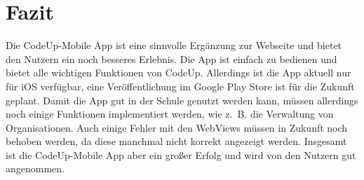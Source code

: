 \documentclass[main.tex]{subfiles}
\begin{document}
    \section{Fazit}
    Die CodeUp-Mobile App ist eine sinnvolle Ergänzung zur Webseite und bietet den Nutzern ein noch besseres Erlebnis.
    Die App ist einfach zu bedienen und bietet alle wichtigen Funktionen von CodeUp.
    Allerdings ist die App aktuell nur für iOS verfügbar, eine Veröffentlichung im Google Play Store ist für die Zukunft geplant.
    Damit die App gut in der Schule genutzt werden kann, müssen allerdings noch einige Funktionen implementiert werden, wie z.~B. die Verwaltung von Organisationen.
    Auch einige Fehler mit den WebViews müssen in Zukunft noch behoben werden, da diese manchmal nicht korrekt angezeigt werden.
    Insgesamt ist die CodeUp-Mobile App aber ein großer Erfolg und wird von den Nutzern gut angenommen.
\end{document}
